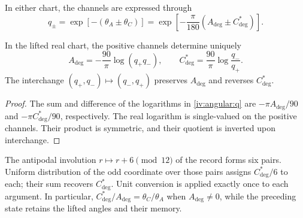 In either chart, the channels are expressed through
\begin{equation}
 q_\pm=\exp[-(\theta_A\pm\theta_C)]
 =\exp\!\left[-\frac{\pi}{180}
                   (A_{\deg}\pm C^*_{\deg})\right].
 \label{iv:angular:q}
\end{equation}

\begin{proposition}
\label{iv:angular:inversion}
In the lifted real chart, the positive channels determine
uniquely
\begin{equation}
 A_{\deg}=-\frac{90}{\pi}\log(q_+q_-),\qquad
 C^*_{\deg}=\frac{90}{\pi}\log\frac{q_-}{q_+}.
 \label{iv:angular:recuperacion}
\end{equation}
The interchange \((q_+,q_-)\mapsto(q_-,q_+)\) preserves
\(A_{\deg}\) and reverses \(C^*_{\deg}\).
\end{proposition}
\begin{proof}
The sum and difference of the logarithms in
\eqref{iv:angular:q} are \(-\pi A_{\deg}/90\) and
\(-\pi C^*_{\deg}/90\), respectively. The real logarithm
is single-valued on the positive channels. Their product is symmetric,
and their quotient is inverted upon interchange.
\end{proof}

The antipodal involution \(r\mapsto r+6\pmod {12}\) of the
record forms six pairs. Uniform distribution of the
odd coordinate over those pairs assigns
\(C^*_{\deg}/6\) to each; their sum recovers
\(C^*_{\deg}\). Unit conversion is applied
exactly once to each argument. In particular,
\(C^*_{\deg}/A_{\deg}=\theta_C/\theta_A\) when
\(A_{\deg}\ne0\), while the preceding state retains
the lifted angles and their memory.

